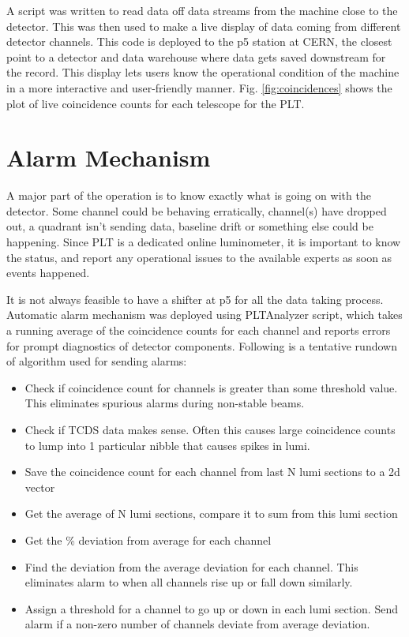 A script was written to read data off data streams from the machine close to the detector. This was then used to make a live display of data coming from different detector channels. This code is deployed to the p5 station at CERN, the closest point to a detector and data warehouse where data gets saved downstream for the record. This display lets users know the operational condition of the machine in a more interactive and user-friendly manner. Fig. \ref{fig:coincidences} shows the plot of live coincidence counts for each telescope for the PLT.




\section{Alarm Mechanism} \label{sec:Alarm}
A major part of the operation is to know exactly what is going on with the detector. Some channel could be behaving erratically, channel(s) have dropped out, a quadrant isn't sending data, baseline drift or something else could be happening. Since PLT is a dedicated online luminometer, it is important to know the status, and report any operational issues to the available experts as soon as events happened.

It is not always feasible to have a shifter at p5 for all the data taking process. Automatic alarm mechanism was deployed using PLTAnalyzer script, which takes a running average of the coincidence counts for each channel and reports errors for prompt diagnostics of detector components. Following is a tentative rundown of algorithm used for sending alarms:



\begin{itemize}
    \item Check if coincidence count for channels is greater than some threshold value. This eliminates spurious alarms during non-stable beams.
    \item Check if TCDS data makes sense. Often this causes large coincidence counts to lump into 1 particular nibble that causes spikes in lumi.
    \item Save the coincidence count for each channel from last N lumi sections to a 2d vector
    \item Get the average of N lumi sections, compare it to sum from this lumi section
    \item Get the \% deviation from average for each channel
    \item Find the deviation from the average deviation for each channel. This eliminates alarm to when all channels rise up or fall down similarly.
    \item Assign a threshold for a channel to go up or down in each lumi section. Send alarm if a non-zero number of channels deviate from average deviation.
\end{itemize}
        
